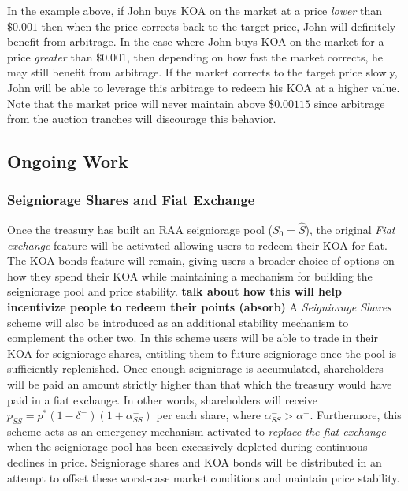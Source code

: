 In the example above, if John buys KOA on the market at a price \textit{lower} than $\$0.001$ then when the price corrects back to the target price, John will definitely benefit from arbitrage. In the case where John buys KOA on the market for a price \textit{greater} than $\$0.001$, then depending on how fast the market corrects, he may still benefit from arbitrage. If the market corrects to the target price slowly, John will be able to leverage this arbitrage to redeem his KOA at a higher value. Note that the market price will never maintain above $\$0.00115$ since arbitrage from the auction tranches will discourage this behavior. 


\subsection{Ongoing Work}

\subsubsection{Seigniorage Shares and Fiat Exchange}

Once the treasury has built an RAA seigniorage pool ($S_0 = \hat{S}$), the original \textit{Fiat exchange} feature will be activated allowing users to redeem their KOA for fiat. The KOA bonds feature will remain, giving users a broader choice of options on how they spend their KOA while maintaining a mechanism for building the seigniorage pool and price stability. \textbf{talk about how this will help incentivize people to redeem their points (absorb)} A \textit{Seigniorage Shares} scheme will also be introduced as an additional stability mechanism to complement the other two. In this scheme users will be able to trade in their KOA for seigniorage shares, entitling them to future seigniorage once the pool is sufficiently replenished. Once enough seigniorage is accumulated, shareholders will be paid an amount strictly higher than that which the treasury would have paid in a fiat exchange. In other words, shareholders will receive $p_{SS} = p^*(1-\delta^-)(1+\alpha^-_{SS})$ per each share, where $\alpha^-_{SS} > \alpha^-$. Furthermore, this scheme acts as an emergency mechanism activated to \textit{replace the fiat exchange} when the seigniorage pool has been excessively depleted during continuous declines in price. Seigniorage shares and KOA bonds will be distributed in an attempt to offset these worst-case market conditions and maintain price stability.

